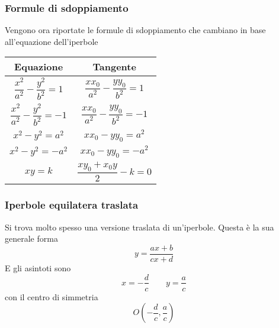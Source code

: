 \subsubsection{Formule di sdoppiamento}
Vengono ora riportate le formule di sdoppiamento che cambiano in base all'equazione dell'iperbole
\begin{center}
  \begin{tabular}{c|c}
    Equazione & Tangente\\\hline
    $\dfrac{x^2}{a^2}-\dfrac{y^2}{b^2}=1$ & $\dfrac{xx_0}{a^2}-\dfrac{yy_0}{b^2}=1$\\\hline
    $\dfrac{x^2}{a^2}-\dfrac{y^2}{b^2}=-1$ & $\dfrac{xx_0}{a^2}-\dfrac{yy_0}{b^2}=-1$\\\hline
    $x^2-y^2=a^2$ & $xx_0-yy_0=a^2$\\\hline
    $x^2-y^2=-a^2$ & $xx_0-yy_0=-a^2$\\\hline
    $xy=k$ & $\dfrac{xy_0+x_0y}{2}-k=0$
  \end{tabular}
\end{center}

\subsubsection{Iperbole equilatera traslata}
Si trova molto spesso una versione traslata di un'iperbole. Questa è la sua generale forma
\begin{equation*}
  y=\frac{ax+b}{cx+d}
\end{equation*}
E gli asintoti sono
\begin{equation*}
  x=-\frac{d}{c}\qquad y=\frac{a}{c}
\end{equation*}
con il centro di simmetria
\begin{equation*}
  O\left(-\frac{d}{c},\frac{a}{c}\right)
\end{equation*}
